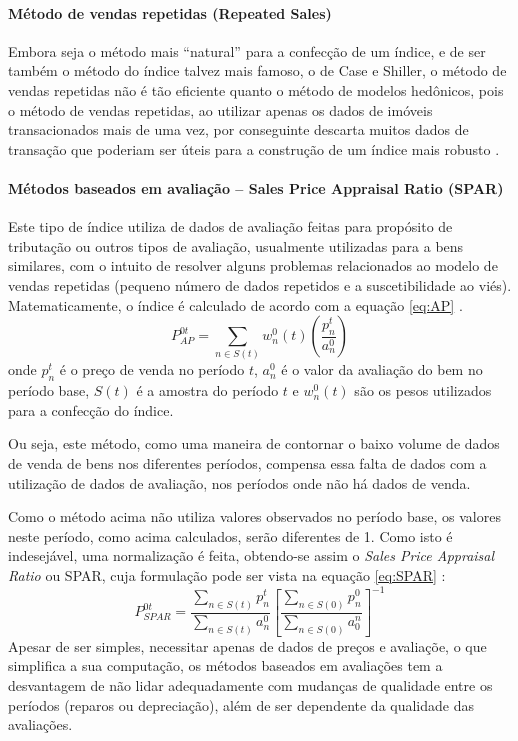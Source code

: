 \documentclass[
	12pt,				%
	oneside,			%
	a4paper,			%
	chapter=TITLE,		%
	section=TITLE,		%
	english,			%
	brazil				%
	]{abntex2}
\begin{document}
\paragraph{Método de vendas repetidas (Repeated
Sales)}\label{muxe9todo-de-vendas-repetidas-repeated-sales}

Embora seja o método mais ``natural'' para a confecção de um índice, e
de ser também o método do índice talvez mais famoso, o de Case e
Shiller, o método de vendas repetidas não é tão eficiente quanto o
método de modelos hedônicos, pois o método de vendas repetidas, ao
utilizar apenas os dados de imóveis transacionados mais de uma vez, por
conseguinte descarta muitos dados de transação que poderiam ser úteis
para a construção de um índice mais robusto \autocite[160]{rppi}.

\paragraph{Métodos baseados em avaliação -- Sales Price Appraisal Ratio
(SPAR)}\label{muxe9todos-baseados-em-avaliauxe7uxe3o-sales-price-appraisal-ratio-spar}

Este tipo de índice utiliza de dados de avaliação feitas para propósito
de tributação ou outros tipos de avaliação, usualmente utilizadas para a
bens similares, com o intuito de resolver alguns problemas relacionados
ao modelo de vendas repetidas (pequeno número de dados repetidos e a
suscetibilidade ao viés). Matematicamente, o índice é calculado de
acordo com a equação \eqref{eq:AP} \autocite[75]{rppi}.
\begin{equation}
P_{AP}^{0t} = \sum_{n \in S(t)} w_n^0(t) \left ( \frac{p_n^t}{a_n^0} \right )
\label{eq:AP}
\end{equation}
onde \(p_n^t\) é o preço de venda no período \(t\), \(a_n^0\) é o valor
da avaliação do bem no período base, \(S(t)\) é a amostra do período
\(t\) e \(w_n^0(t)\) são os pesos utilizados para a confecção do índice.

Ou seja, este método, como uma maneira de contornar o baixo volume de
dados de venda de bens nos diferentes períodos, compensa essa falta de
dados com a utilização de dados de avaliação, nos períodos onde não há
dados de venda.

Como o método acima não utiliza valores observados no período base, os
valores neste período, como acima calculados, serão diferentes de 1.
Como isto é indesejável, uma normalização é feita, obtendo-se assim o
\emph{Sales Price Appraisal Ratio} ou SPAR, cuja formulação pode ser
vista na equação \eqref{eq:SPAR} \autocite[75]{rppi}:
\begin{equation}
P_{SPAR}^{0t} = \frac{\sum\limits_{n \in S(t)} p_n^t}{\sum\limits_{n \in S(t)} a_n^0} \left [ \frac{\sum\limits_{n \in S(0)} p_n^0}{\sum\limits_{n \in S(0)} a_0^n} \right ]^{-1}
\label{eq:SPAR}
\end{equation}
Apesar de ser simples, necessitar apenas de dados de preços e avaliaçõe,
o que simplifica a sua computação, os métodos baseados em avaliações tem
a desvantagem de não lidar adequadamente com mudanças de qualidade entre
os períodos (reparos ou depreciação), além de ser dependente da
qualidade das avaliações.
\end{document}
